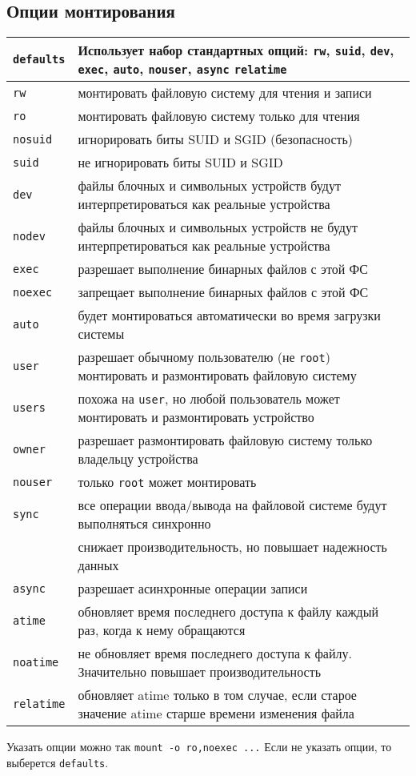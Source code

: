 \documentclass[10pt]{article}
\begin{document}
\subsection*{Опции монтирования}
\begin{flushleft}
\begin{tabular}{ p{2cm} | l }
 \texttt{defaults} & Использует набор стандартных опций: \texttt{rw}, \texttt{suid}, \texttt{dev}, \texttt{exec}, \texttt{auto}, \texttt{nouser}, \texttt{async} \texttt{relatime}\\ \hline
 \texttt{rw} 		& монтировать файловую систему для чтения и записи\\ 
 \texttt{ro} 		& монтировать файловую систему только для чтения\\  \hline
 \texttt{nosuid}	& игнорировать биты SUID и SGID (безопасность)\\
 \texttt{suid}	    & не игнорировать биты SUID и SGID\\  \hline
 \texttt{dev}       & файлы блочных и символьных устройств будут интерпретироваться как реальные устройства\\
 \texttt{nodev}     & файлы блочных и символьных устройств не будут интерпретироваться как реальные устройства\\ \hline
 \texttt{exec} 		& разрешает выполнение бинарных файлов с этой ФС\\
 \texttt{noexec} 	& запрещает выполнение бинарных файлов с этой ФС\\ \hline
 \texttt{auto}      & будет монтироваться автоматически во время загрузки системы \\ \hline
 \texttt{user} & разрешает обычному пользователю (не \texttt{root}) монтировать и размонтировать файловую систему\\ 
 \texttt{users} & похожа на \texttt{user}, но любой пользователь может монтировать и размонтировать устройство\\ 
 \texttt{owner} & разрешает размонтировать файловую систему только владельцу устройства\\ 
 \texttt{nouser} & только \texttt{root} может монтировать \\ \hline
 \texttt{sync} & все операции ввода/вывода на файловой системе будут выполняться синхронно\\
               & снижает производительность, но повышает надежность данных\\ 
 \texttt{async} & разрешает асинхронные операции записи \\ \hline
 \texttt{atime} & обновляет время последнего доступа к файлу каждый раз, когда к нему обращаются\\ 
 \texttt{noatime} & не обновляет время последнего доступа к файлу. Значительно повышает производительность\\ 
 \texttt{relatime} & обновляет atime только в том случае, если старое значение atime старше времени изменения файла\\ 
\end{tabular}
\end{flushleft}
Указать опции можно так \texttt{mount -o ro,noexec ...} Если не указать опции, то выберется \texttt{defaults}.
\end{document}
